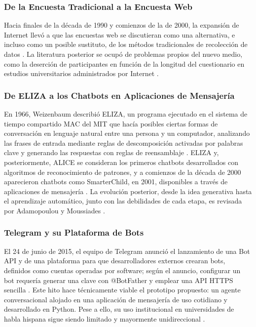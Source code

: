 \documentclass[12pt,letterpaper]{article}
\begin{document}
\subsubsection{De la Encuesta Tradicional a la Encuesta Web}
 
Hacia finales de la década de 1990 y comienzos de la de 2000, la expansión de Internet llevó a que las encuestas web se discutieran como una alternativa, e incluso como un posible sustituto, de los métodos tradicionales de recolección de datos \cite{couper2000}. La literatura posterior se ocupó de problemas propios del nuevo medio, como la deserción de participantes en función de la longitud del cuestionario en estudios universitarios administrados por Internet \cite{hoerger2010}.
 
\subsubsection{De ELIZA a los Chatbots en Aplicaciones de Mensajería}
 
En 1966, Weizenbaum describió ELIZA, un programa ejecutado en el sistema de tiempo compartido MAC del MIT que hacía posibles ciertas formas de conversación en lenguaje natural entre una persona y un computador, analizando las frases de entrada mediante reglas de descomposición activadas por palabras clave y generando las respuestas con reglas de reensamblaje \cite{weizenbaum1966}. ELIZA y, posteriormente, ALICE se consideran los primeros chatbots desarrollados con algoritmos de reconocimiento de patrones, y a comienzos de la década de 2000 aparecieron chatbots como SmarterChild, en 2001, disponibles a través de aplicaciones de mensajería \cite{adamopoulou2020overview}. La evolución posterior, desde la idea generativa hasta el aprendizaje automático, junto con las debilidades de cada etapa, es revisada por Adamopoulou y Moussiades \cite{adamopoulou2020}.
 
\subsubsection{Telegram y su Plataforma de Bots}
 
El 24 de junio de 2015, el equipo de Telegram anunció el lanzamiento de una Bot API y de una plataforma para que desarrolladores externos crearan bots, definidos como cuentas operadas por software; según el anuncio, configurar un bot requería generar una clave con @BotFather y emplear una API HTTPS sencilla \cite{telegram2015}. Este hito hace técnicamente viable el prototipo propuesto: un agente conversacional alojado en una aplicación de mensajería de uso cotidiano y desarrollado en Python. Pese a ello, su uso institucional en universidades de habla hispana sigue siendo limitado y mayormente unidireccional \cite{cisternas2022}.
 
\end{document}
